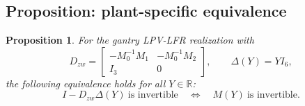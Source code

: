 \documentclass[11pt]{article}
\newtheorem{proposition}[lemma]{Proposition}
\begin{document}
\subsection{Proposition: plant-specific equivalence}

\begin{proposition}
\label{prop:wellposed}
For the gantry LPV-LFR realization with
\begin{equation}
    D_{zw} =
    \begin{bmatrix}
        -M_0^{-1}M_1 & -M_0^{-1}M_2 \\
        I_3 & 0
    \end{bmatrix},
    \qquad
    \Delta(Y) = YI_6,
    \label{eq:DzwDelta}
\end{equation}
the following equivalence holds for all $Y\in\mathbb{R}$:
\begin{equation}
    I - D_{zw}\Delta(Y)\ \text{is invertible}
    \quad\Longleftrightarrow\quad
    M(Y)\ \text{is invertible}.
    \label{eq:mainequiv}
\end{equation}
\end{proposition}
\end{document}
